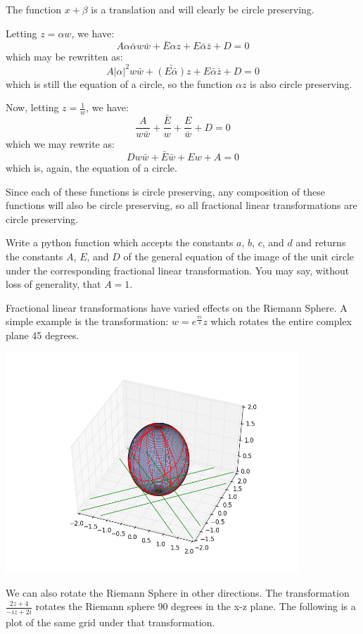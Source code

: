 The function $x+\beta$ is a translation and will clearly be circle preserving.

Letting $z=\alpha w$, we have: 
$$A\alpha \bar{\alpha} w\bar{w}+\bar{E}\alpha z+E\bar{\alpha} \bar{z}+D=0$$
which may be rewritten as:
$$A|\alpha|^2 w\bar{w}+\bar{(E\bar{\alpha})}z+E\bar{\alpha} \bar{z}+D=0$$
which is still the equation of a circle, so the function $\alpha z$ is also circle preserving.

Now, letting $z=\frac{1}{w}$, we have:
$$\frac{A}{w\bar{w}}+\frac{\bar{E}}{w}+\frac{E}{\bar{w}}+D=0$$
which we may rewrite as:
$$Dw\bar{w}+\bar{E}\bar{w}+Ew+A=0$$
which is, again, the equation of a circle.

Since each of these functions is circle preserving, any composition of these functions will also be circle preserving, so all fractional linear transformations are circle preserving.

\begin{problem}
Write a python function which accepts the constants $a$, $b$, $c$, and $d$ and returns the constants $A$, $E$, and $D$ of the general equation of the image of the unit circle under the corresponding fractional linear transformation. You may say, without loss of generality, that $A=1$.
\end{problem}

Fractional linear transformations have varied effects on the Riemann Sphere. A simple example is the transformation: $w=e^{\frac{\pi i}{4}}z$ which rotates the entire complex plane 45 degrees.

\includegraphics[width=110mm]{mobius4.png}

We can also rotate the Riemann Sphere in other directions. The transformation $\frac{2z+4}{-iz+2i}$ rotates the Riemann sphere 90 degrees in the x-z plane. The following is a plot of the same grid under that transformation.

